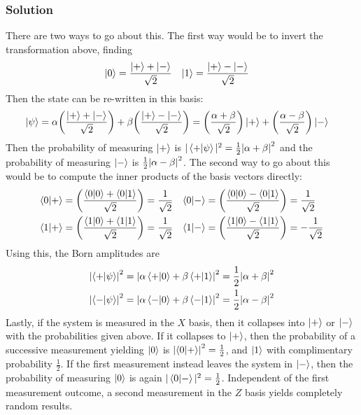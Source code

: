 \documentclass{article}
\begin{document}
\subsubsection*{Solution}
There are two ways to go about this. The first way would be to invert the transformation above, finding
\begin{align*}
    \ket{0} &= \frac{\ket + + \ket -}{\sqrt{2}} & \ket{1} &= \frac{\ket + - \ket -}{\sqrt{2}}
\end{align*}
Then the state can be re-written in this basis:
\begin{align*}
\ket{\psi} &= \alpha \qty(\frac{\ket + + \ket -}{\sqrt{2}}) + \beta \qty(\frac{\ket + - \ket -}{\sqrt{2}})
= \qty(\frac{\alpha + \beta}{\sqrt{2}})\ket{+} + \qty(\frac{\alpha - \beta}{\sqrt{2}})\ket{-}
\end{align*}
Then the probability of measuring $\ket{+}$ is $|\braket{+}{\psi}|^2 = \frac{1}{2}\qty|\alpha + \beta|^2$ and the probability of measuring $\ket{-}$ is $\frac{1}{2}\qty|\alpha - \beta|^2$. The second way to go about this would be to compute the inner products of the basis vectors directly:
\begin{align*}
\braket{0}{+} &= \qty(\frac{\braket{0}{0} + \bra{0}\ket{1}}{\sqrt{2}}) = \frac{1}{\sqrt{2}} & \braket{0}{-} &= \qty(\frac{\braket{0}{0} - \bra{0}\ket{1}}{\sqrt{2}}) = \frac{1}{\sqrt{2}} \\
\braket{1}{+} &= \qty(\frac{\braket{1}{0} + \bra{1}\ket{1}}{\sqrt{2}}) = \frac{1}{\sqrt{2}} & \braket{1}{-} &= \qty(\frac{\braket{1}{0} - \bra{1}\ket{1}}{\sqrt{2}}) = -\frac{1}{\sqrt{2}} \\
\end{align*}
Using this, the Born amplitudes are
\begin{align*}
    \qty|\braket{+}{\psi}|^2 &= \qty|\alpha\braket{+}{0}+ \beta\braket{+}{1}|^2 = \frac{1}{2}\qty|\alpha + \beta|^2 \\
    \qty|\braket{-}{\psi}|^2 &= \qty|\alpha\braket{-}{0}+ \beta\braket{-}{1}|^2 = \frac{1}{2}\qty|\alpha - \beta|^2
\end{align*}
Lastly, if the system is measured in the $X$ basis, then it collapses into $\ket{+}$ or $\ket{-}$ with the probabilities given above. If it collapses to $\ket{+}$, then the probability of a successive measurement yielding $\ket{0}$ is $\qty|\braket{0}{+}|^2 = \frac{1}{2}$, and $\ket{1}$ with complimentary probability $\frac{1}{2}$. If the first measurement instead leaves the system in $\ket{-}$, then the probability of measuring $\ket{0}$ is again $|\braket{0}{-}|^2 =\frac{1}{2}$. Independent of the first measurement outcome, a second measurement in the $Z$ basis yields completely random results.
\end{document}
